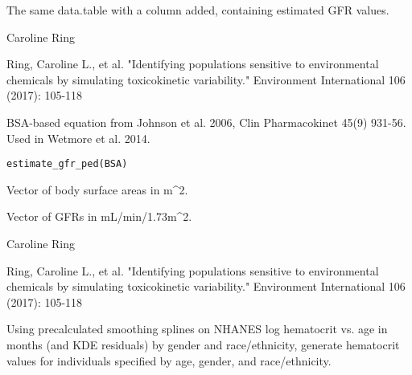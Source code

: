 \documentclass[a4paper]{book}
\begin{document}
%
\begin{Value}
The same data.table with a  column added, containing 
estimated GFR values.
\end{Value}
%
\begin{Author}\relax
Caroline Ring
\end{Author}
%
\begin{References}\relax
Ring, Caroline L., et al. "Identifying populations sensitive to 
environmental chemicals by simulating toxicokinetic variability." Environment 
International 106 (2017): 105-118
\end{References}
%
\begin{Description}\relax
BSA-based equation from Johnson et al. 2006, Clin Pharmacokinet 45(9) 931-56. 
Used in Wetmore et al. 2014.
\end{Description}
%
\begin{Usage}
\begin{verbatim}
estimate_gfr_ped(BSA)
\end{verbatim}
\end{Usage}
%
\begin{Arguments}
\begin{ldescription}
\item[\code{BSA}] Vector of body surface areas in m\textasciicircum{}2.
\end{ldescription}
\end{Arguments}
%
\begin{Value}
Vector of GFRs in mL/min/1.73m\textasciicircum{}2.
\end{Value}
%
\begin{Author}\relax
Caroline Ring
\end{Author}
%
\begin{References}\relax
Ring, Caroline L., et al. "Identifying populations sensitive to 
environmental chemicals by simulating toxicokinetic variability." Environment 
International 106 (2017): 105-118
\end{References}
%
\begin{Description}\relax
Using precalculated smoothing splines on NHANES log hematocrit vs. age in 
months (and KDE residuals) by gender and race/ethnicity, generate hematocrit 
values for individuals specified by age, gender, and race/ethnicity.
\end{Description}
\end{document}
